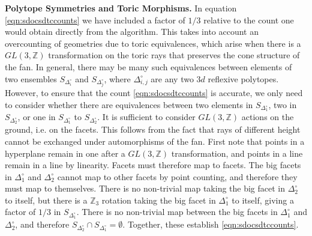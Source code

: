 \documentclass[aps,prl,twocolumn, superscriptaddress,groupedaddress,nofootinbib]{revtex4-1}
\newcommand{\bZ}{\mathbb{Z}}
\newcommand{\sdoc}{S_{\Delta_1^\circ}}
\newcommand{\sdtc}{S_{\Delta_2^\circ}}
\newcommand{\doc}{{\Delta_1^\circ}}
\newcommand{\dtc}{{\Delta_2^\circ}}
\begin{document}
\vspace{.2cm}
\noindent \textbf{Polytope Symmetries and Toric Morphisms.}
In equation \eqref{eqn:sdocsdtccounts} 
we have included a factor of
$1/3$ relative to the count one would obtain directly from the algorithm.
This takes into account an overcounting of geometries due to toric equivalences,
which arise when there is a $GL(3,\bZ)$ transformation on the toric rays
that preserves the cone structure of the fan. In general, there may
be many such equivalences between elements of two ensembles $S_{\Delta_i^\circ}$
and $S_{\Delta_j^\circ}$, where $\Delta_{i,j}^\circ$ are any two $3d$ reflexive
polytopes. However, to ensure that the count  \eqref{eqn:sdocsdtccounts} is accurate,
we only need to consider whether there are equivalences between
two elements in $\sdoc$, two in $\sdtc$, or one in $\sdoc$ to $\sdtc$. It is sufficient to consider $GL(3,\bZ)$ actions
on the ground, i.e. on the facets. This follows from the fact that rays of different height cannot be exchanged under automorphisms of the fan. First note that points in a hyperplane remain in one after a $GL(3,\bZ)$ transformation, and points
in a line remain in a line by linearity. Facets must therefore map to
facets. The big facets in $\doc$ and $\dtc$ cannot map
to other facets by point counting, and therefore they
must map to themselves. There is no non-trivial map
taking the big facet in $\dtc$ to itself, but there is
a $\bZ_3$ rotation taking the big facet in $\doc$ to itself, giving a factor of $1/3$ in $\sdoc$. There is no non-trivial
map between the big facets in $\doc$ and $\dtc$, and therefore
$\sdtc\cap \sdoc  = \emptyset.$ Together, these establish
\eqref{eqn:sdocsdtccounts}.
\end{document}
